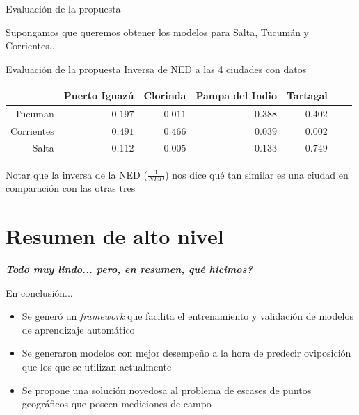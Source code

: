 \documentclass[10pt]{beamer}
\newcommand\IncrFont{\fontsize{20}{20}\selectfont}
\begin{document}
\begin{frame}{Evaluación de la propuesta}
  \fontsize{12}{12}\selectfont

  \begin{center}
    Supongamos que queremos obtener los modelos para Salta, Tucumán y Corrientes...
  \end{center}
\end{frame}



\begin{frame}{Evaluación de la propuesta}
\centering
Inversa de NED a las 4 ciudades con datos
\begin{tabular}{*7{r}}
\toprule
& Puerto Iguazú
& Clorinda
& Pampa del Indio
& Tartagal \\ \midrule
Tucuman
&$0.197$
&$0.011$
&$0.388$%
&$0.402$\\
Corrientes
&$0.491$
&$0.466$
&$0.039$
&$0.002$ \\
Salta
&$0.112$
&$0.005$
&$0.133$   %
&$0.749$ \\
\bottomrule
\end{tabular}
\pause
\begin{center}
  Notar que la inversa de la NED ($\frac{1}{NED}$) nos dice qué tan similar
  es una ciudad en comparación con las otras tres
\end{center}

\end{frame}


\section{Resumen de alto nivel}


\begin{frame}{}
  \IncrFont
  \begin{center}
    \textit{\textbf{Todo muy lindo... pero, en resumen, qué hicimos?}}
  \end{center}
\end{frame}


\begin{frame}{En conclusión...}
  \begin{itemize}[<+->]
    \item Se generó un \textit{framework} que facilita el entrenamiento y
        validación de modelos de aprendizaje automático
    \item Se generaron modelos con mejor desempeño a la hora de predecir
        oviposición que los que se utilizan actualmente
    \item Se propone una solución novedosa al problema de escases de puntos
        geográficos que poseen mediciones de campo
  \end{itemize}
\end{frame}
\end{document}

